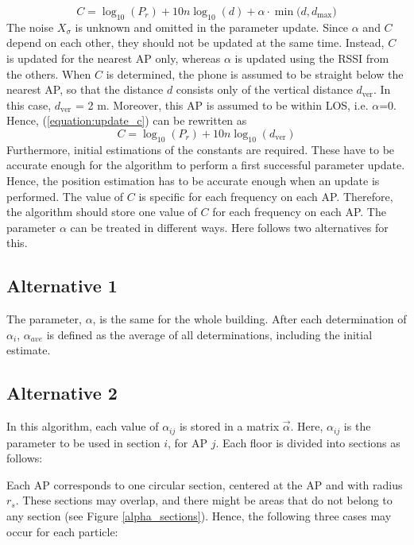\documentclass{LTHthesis}
\begin{document}
%
\begin{equation}
C = \log_{10}(P_r)+10n\log_{10}(d)+\alpha\cdot\min({d, d_{\text{max}})}
\label{equation:update_c}
\end{equation}
%
The noise $X_\sigma$ is unknown and omitted in the parameter update. 
%
Since $\alpha$ and $C$ depend on each other, they should not be updated at the same time. Instead, $C$ is updated for the nearest AP only, whereas $\alpha$ is updated using the RSSI from the others. When $C$ is determined, the phone is assumed to be straight below the nearest AP, so that the distance $d$ consists only of the vertical distance $d_{\text{ver}}$. In this case, $d_{\text{ver}}$ = 2 m. Moreover, this AP is assumed to be within LOS, i.e. $\alpha$=0. Hence, (\ref{equation:update_c}) can be rewritten as
%
\begin{equation}
C = \log_{10}(P_r)+10n\log_{10}(d_{\text{ver}})
\label{equation:update_c_simple}
\end{equation}
%
Furthermore, initial estimations of the constants are required. These have to be accurate enough for the algorithm to perform a first successful parameter update. Hence, the position estimation has to be accurate enough when an update is performed. 
%
The value of $C$ is specific for each frequency on each AP. Therefore, the algorithm should store one value of $C$ for each frequency on each AP.
The parameter $\alpha$ can be treated in different ways. Here follows two alternatives for this.

\subsection{Alternative 1}
The parameter, $\alpha$, is the same for the whole building. After each determination of $\alpha_i$, $\alpha_{ave}$ is defined as the average of all determinations, including the initial estimate.


%
\subsection{Alternative 2}
In this algorithm, each value of $\alpha_{ij}$ is stored in a matrix $\vec{\alpha}$. Here, $\alpha_{ij}$ is the parameter to be used in section $i$, for AP $j$. Each floor is divided into sections as follows:

Each AP corresponds to one circular section, centered at the AP and with radius $r_s$. These sections may overlap, and there might be areas that do not belong to any section (see Figure \ref{alpha_sections}). Hence, the following three cases may occur for each particle:
\end{document}
